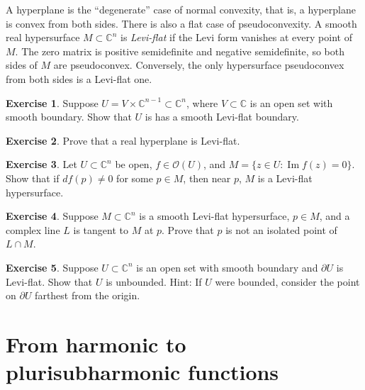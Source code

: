 \documentclass[12pt,openany]{book}
\renewcommand{\Im}{\operatorname{Im}}
\newcommand{\C}{{\mathbb{C}}}
\newcommand{\sO}{{\mathscr{O}}}
\newcommand{\myindex}[1]{#1\index{#1}}
\theoremstyle{plain}
\theoremstyle{remark}
\theoremstyle{definition}
\newenvironment{exbox}{%
    \def\FrameCommand{\vrule width 1pt \relax\hspace{10pt}}%
    \MakeFramed{\advance\hsize-\width\FrameRestore}%
}{%
    \endMakeFramed
}
\theoremstyle{exercise}
\newtheorem{exercise}{Exercise}[section]
\theoremstyle{example}
\begin{document}
A hyperplane is the ``degenerate'' case of normal convexity,
that is, a hyperplane is convex from both sides.
There is also a flat case of pseudoconvexity.  A smooth real hypersurface
$M \subset \C^n$ is \emph{\myindex{Levi-flat}} if the Levi form
vanishes at every point of $M$.  The zero matrix is positive semidefinite
and negative semidefinite, so both sides of $M$ are pseudoconvex.
Conversely, the only hypersurface pseudoconvex from both sides is a
Levi-flat one.

\begin{exbox}
\begin{exercise}
Suppose $U = V \times \C^{n-1} \subset \C^n$, where $V \subset \C$ is an
open set with smooth boundary.  Show that $U$ is has a smooth Levi-flat boundary.
\end{exercise}

\begin{exercise}
Prove that a real hyperplane is Levi-flat.
\end{exercise}

\begin{exercise}
Let $U \subset \C^n$ be open, $f \in \sO(U)$, and
$M = \bigl\{ z \in U : \Im f(z) = 0 \bigr\}$.  Show that
if $df(p) \not=0$ for some $p \in M$, then near $p$,
$M$ is a Levi-flat hypersurface.
\end{exercise}


\begin{exercise}
Suppose $M \subset \C^n$ is a smooth Levi-flat hypersurface,
$p \in M$, and
a complex line $L$ is tangent to $M$ at $p$.
Prove that $p$ is not an isolated point of $L \cap M$.
\end{exercise}

\begin{exercise}
Suppose $U \subset \C^n$ is an open set with smooth boundary
and $\partial U$ is Levi-flat.
Show that $U$ is unbounded.
Hint: If $U$ were bounded, consider the point on $\partial U$ farthest from
the origin.
\end{exercise}
\end{exbox}


\section{From harmonic to plurisubharmonic functions}
\label{sec:harmonic}
\end{document}
